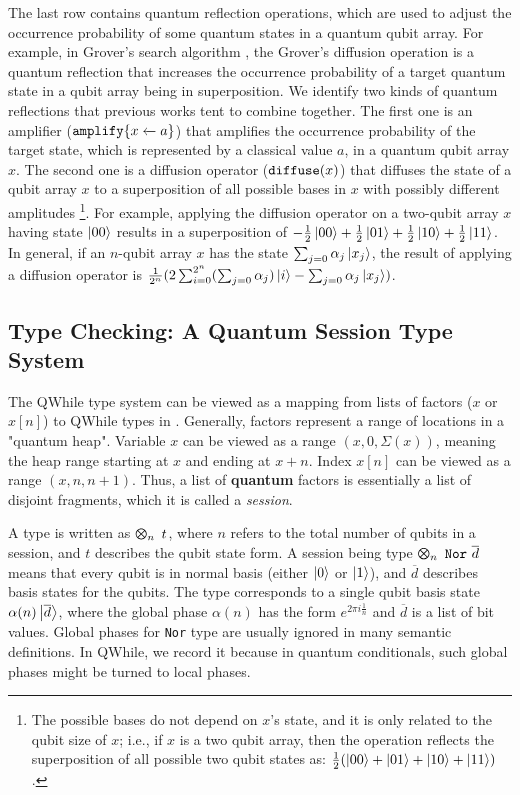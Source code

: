 The last row contains quantum reflection operations,
which are used to adjust the occurrence probability of
some quantum states in a quantum qubit array.
For example, in Grover's search algorithm \cite{grover1996},
the Grover's diffusion operation is a quantum reflection
that increases the occurrence probability of a target quantum state in a qubit array being in superposition.
We identify two kinds of quantum reflections that previous works tent to combine together.
The first one is an amplifier ($\texttt{amplify}\{{x} \xleftarrow{} {a}\}$)
that amplifies the occurrence probability of the target state,
which is represented by a classical value $a$,
in a quantum qubit array $x$.
The second one is a diffusion operator ($\texttt{diffuse}(x)$)
that diffuses the state of a qubit array $x$ to a superposition of 
all possible bases in $x$ with possibly different amplitudes \footnote{The possible bases do not depend on $x$'s state, and it is only related to the qubit size of $x$; i.e., if $x$ is a two qubit array, then the operation reflects the superposition of all possible two qubit states as: $\frac{1}{2}(\left\vert{00}\right\rangle+\left\vert{01}\right\rangle+\left\vert{10}\right\rangle+\left\vert{11}\right\rangle)$.  }.
For example, applying the diffusion operator on a two-qubit array $x$ having state $\left\vert{00}\right\rangle$
results in a superposition of $-\frac{1}{2}\left\vert{00}\right\rangle+\frac{1}{2}\left\vert{01}\right\rangle+\frac{1}{2}\left\vert{10}\right\rangle+\frac{1}{2}\left\vert{11}\right\rangle$.
In general, if an $n$-qubit array $x$ has the state $\sum_{j=0}\alpha_j\left\vert{x_j}\right\rangle$,
the result of applying a diffusion operator is $\frac{1}{2^{n}}(2\sum_{i=0}^{2^n}(\sum_{j=0}\alpha_j)\left\vert{i}\right\rangle - \sum_{j=0}\alpha_j\left\vert{x_j}\right\rangle)$.

\subsection{Type Checking: A Quantum Session Type System}\label{sec:typesystem}

The QWhile type system can be viewed as a mapping from lists of factors ($x$ or $x[n]$) to QWhile types in .
Generally, factors represent a range of locations in a "quantum heap".
Variable $x$ can be viewed as a range $(x,0,\Sigma(x))$, meaning the heap range starting at $x$ and ending at $x+n$.
Index $x[n]$ can be viewed as a range $(x,n,n+1)$.
Thus, a list of \textbf{quantum} factors is essentially a list of disjoint fragments, which it is called a \textit{session}.

A type is written as $\ttype{n}{t}$, where $n$ refers to the total number of qubits in a session,
and $t$ describes the qubit state form. 
A session being type $\ttype{n}{\tnor{\overline{d}}}$
means that every qubit is in normal basis (either $\left\vert{0}\right\rangle$ or $\left\vert{1}\right\rangle$),
and $\overline{d}$ describes basis states for the qubits.
The type corresponds to a single qubit basis state $\alpha(n)\left\vert{\overline{d}}\right\rangle$,
where the global phase $\alpha(n)$ has the form $e^{2 \pi i \frac{1}{n}}$ and $\overline{d}$ is a list of bit values.
Global phases for \texttt{Nor} type are usually ignored in many semantic definitions.
In QWhile, we record it because in quantum conditionals, such global phases might be turned to local phases.

